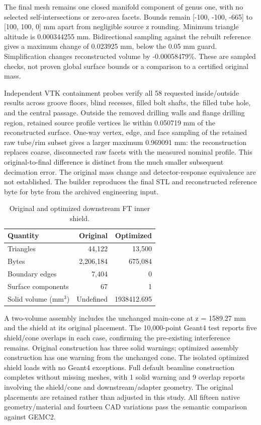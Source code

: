 The final mesh remains one closed manifold component of genus one, with no selected self-intersections or
zero-area facets. Bounds remain [-100, -100, -665] to [100, 100, 0] mm apart from negligible source z
rounding. Minimum triangle altitude is 0.000344255 mm. Bidirectional sampling against the rebuilt reference
gives a maximum change of 0.023925 mm, below the 0.05 mm guard. Simplification changes reconstructed volume
by -0.00058479\%. These are sampled checks, not proven global surface bounds or a comparison to a certified
original mass.

Independent VTK containment probes verify all 58 requested inside/outside results across groove floors,
blind recesses, filled bolt shafts, the filled tube hole, and the central passage. Outside the removed
drilling walls and flange drilling region, retained source profile vertices lie within 0.050719 mm of the
reconstructed surface. One-way vertex, edge, and face sampling of the retained raw tube/rim subset gives a
larger maximum 0.969091 mm: the reconstruction replaces coarse, disconnected raw facets with the measured
nominal profile. This original-to-final difference is distinct from the much smaller subsequent decimation
error. The original mass change and detector-response equivalence are not established. The builder
reproduces the final STL and reconstructed reference byte for byte from the archived engineering input.

\begin{table}[htbp]
\centering
\caption{Original and optimized downstream FT inner shield.}
\label{tab:ft-shield-mesh}
\begin{tabular}{lrr}
\toprule
Quantity & Original & Optimized \\
\midrule
Triangles & 44,122 & 13,500 \\
Bytes & 2,206,184 & 675,084 \\
Boundary edges & 7,404 & 0 \\
Surface components & 67 & 1 \\
Solid volume (mm$^3$) & Undefined & 1938412.695 \\
\bottomrule
\end{tabular}
\end{table}

A two-volume assembly includes the unchanged main-cone at z = 1589.27 mm and the shield at its original
placement. The 10,000-point Geant4 test reports five shield/cone overlaps in each case, confirming the
pre-existing interference remains. Original construction has three solid warnings; optimized assembly
construction has one warning from the unchanged cone. The isolated optimized shield loads with no Geant4
exceptions. Full default beamline construction completes without missing meshes, with 1 solid warning and 9
overlap reports involving the shield/cone and downstream/adapter geometry. The original placements are
retained rather than adjusted in this study. All fifteen native geometry/material and fourteen CAD
variations pass the semantic comparison against GEMC2.

